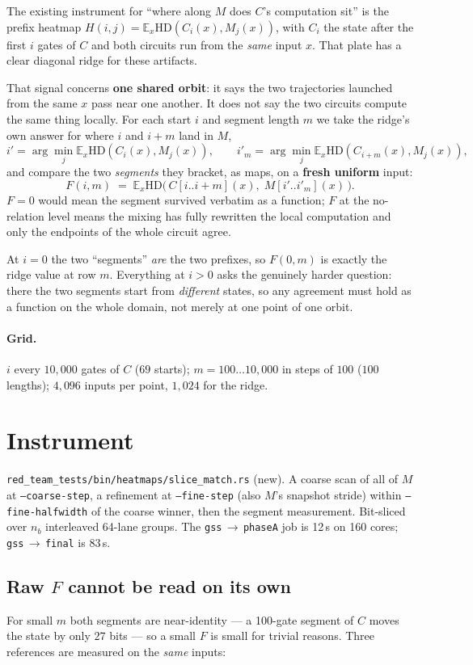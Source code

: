 \documentclass[11pt]{article}
\newcommand{\code}[1]{\texttt{#1}}
\newcommand{\HD}{\mathrm{HD}}
\newcommand{\Ex}{\mathbb{E}_x}
\begin{document}
The existing instrument for ``where along $M$ does $C$'s computation sit'' is the prefix heatmap
$H(i,j)=\Ex \HD(C_i(x),M_j(x))$, with $C_i$ the state after the first $i$ gates of $C$ and both
circuits run from the \emph{same} input $x$. That plate has a clear diagonal ridge for these artifacts.

That signal concerns \textbf{one shared orbit}: it says the two trajectories launched from the same $x$
pass near one another. It does not say the two circuits compute the same thing locally. For each start
$i$ and segment length $m$ we take the ridge's own answer for where $i$ and $i+m$ land in $M$,
\[
i' = \arg\min_j \Ex \HD(C_i(x), M_j(x)),
\qquad
i'_m = \arg\min_j \Ex \HD(C_{i+m}(x), M_j(x)),
\]
and compare the two \emph{segments} they bracket, as maps, on a \textbf{fresh uniform} input:
\[
\boxed{\;F(i,m) \;=\; \Ex \HD\!\big(\,C[i..i{+}m](x),\; M[i'..i'_m](x)\,\big).\;}
\]
$F=0$ would mean the segment survived verbatim as a function; $F$ at the no-relation level means the
mixing has fully rewritten the local computation and only the endpoints of the whole circuit agree.

At $i=0$ the two ``segments'' \emph{are} the two prefixes, so $F(0,m)$ is exactly the ridge value at row
$m$. Everything at $i>0$ asks the genuinely harder question: there the two segments start from
\emph{different} states, so any agreement must hold as a function on the whole domain, not merely at one
point of one orbit.

\paragraph{Grid.} $i$ every $10{,}000$ gates of $C$ ($69$ starts); $m=100\ldots10{,}000$ in steps of
$100$ ($100$ lengths); $4{,}096$ inputs per point, $1{,}024$ for the ridge.

\section{Instrument}

\code{red\_team\_tests/bin/heatmaps/slice\_match.rs} (new). A coarse scan of all of $M$ at
\code{--coarse-step}, a refinement at \code{--fine-step} (also $M$'s snapshot stride) within
\code{--fine-halfwidth} of the coarse winner, then the segment measurement. Bit-sliced over $n_b$
interleaved 64-lane groups. The \code{gss}\,$\to$\,\code{phaseA} job is 12\,s on 160 cores;
\code{gss}\,$\to$\,\code{final} is 83\,s.

\subsection{Raw $F$ cannot be read on its own}
For small $m$ both segments are near-identity --- a 100-gate segment of $C$ moves the state by only
$27$ bits --- so a small $F$ is small for trivial reasons. Three references are measured on the
\emph{same} inputs:
\end{document}
